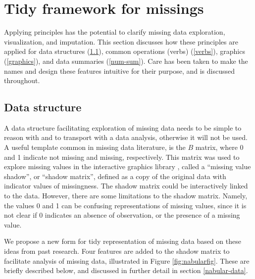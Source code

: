 \documentclass[
]{jss}
\begin{document}
\hypertarget{extensions}{%
\section{Tidy framework for missings}\label{extensions}}

Applying  principles has the potential to clarify missing data exploration, visualization, and imputation. This section discusses how these principles are applied for data structures (\ref{data-structure}), common operations (verbs) (\ref{verbs}), graphics (\ref{graphics}), and data summaries (\ref{num-sum}). Care has been taken to make the names and design these features intuitive for their purpose, and is discussed throughout.

\hypertarget{data-structure}{%
\subsection{Data structure}\label{data-structure}}

A data structure facilitating exploration of missing data needs to be simple to reason with and to transport with a data analysis, otherwise it will not be used. A useful template common in missing data literature, is the \(B\) matrix, where 0 and 1 indicate not missing and missing, respectively. This matrix was used to explore missing values in the interactive graphics library , called a ``missing value shadow'', or ``shadow matrix'', defined as a copy of the original data with indicator values of missingness. The shadow matrix could be interactively linked to the data. However, there are some limitations to the shadow matrix. Namely, the values 0 and 1 can be confusing representations of missing values, since it is not clear if 0 indicates an absence of observation, or the presence of a missing value.

We propose a new form for tidy representation of missing data based on these ideas from past research. Four features are added to the shadow matrix to facilitate analysis of missing data, illustrated in Figure \ref{fig:nabularfig}. These are briefly described below, and discussed in further detail in section \ref{nabular-data}.
\end{document}
